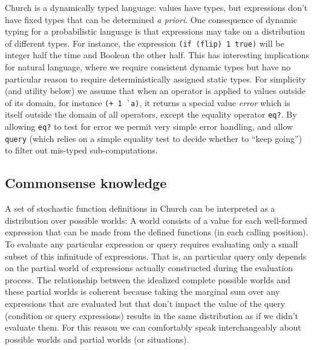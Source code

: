 \documentclass[12pt]{article}
\begin{document}

\label{bottom-val}
Church is a dynamically typed language: values have types, but expressions don't have fixed types that can be determined \emph{a priori}. 
One consequence of dynamic typing for a probabilistic language is that expressions may take on a distribution of different types. For instance, the expression \lstinline{(if (flip) 1 true)} will be integer half the time and Boolean the other half. This has interesting implications for natural language, where we require consistent dynamic types but have no particular reason to require deterministically assigned static types.
For simplicity (and utility below) we assume that when an operator is applied to values outside of its domain, for instance \lstinline{(+ 1 `a)}, it returns a special value \emph{error} which is itself outside the domain of all operators, except the equality operator \lstinline{eq?}. By allowing \lstinline{eq?} to test for error we permit very simple error handling, and allow \lstinline{query} (which relies on a simple equality test to decide whether to ``keep going'') to filter out mis-typed sub-computations.




\subsection{Commonsense knowledge}

A set of stochastic function definitions in Church can be interpreted as a distribution over possible worlds: A world consists of a value for each well-formed expression that can be made from the defined functions (in each calling position). 
To evaluate any particular expression or query requires evaluating only a small subset of this infinitude of expressions. 
That is, an particular query only depends on the partial world of expressions actually constructed during the evaluation process. 
The relationship between the idealized complete possible worlds and these partial worlds is coherent because taking the marginal sum over any expressions that are evaluated but that don't impact the value of the query (condition or query expressions) results in the same distribution as if we didn't evaluate them. 
For this reason we can comfortably speak interchangeably about possible worlds and partial worlds (or situations).
\end{document}
